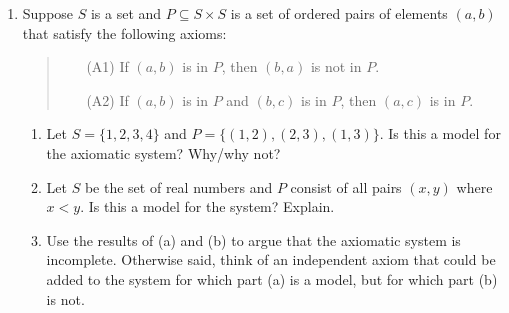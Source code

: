 \begin{exercises}{}{}
\begin{enumerate}
	
	
		\item Suppose $S$ is a set and $P\subseteq S\times S$ is a set of ordered pairs of elements $(a,b)$ that satisfy the following axioms:
	  \begin{quote}
	  \begin{itemize}
	  	\item[(A1)] If $(a,b)$ is in $P$, then $(b,a)$ is not in $P$.
	  	\item[(A2)] If $(a,b)$ is in $P$ and $(b,c)$ is in $P$, then $(a,c)$ is in $P$.
	  \end{itemize}
	  \end{quote}
	  \begin{enumerate}
	    \item Let $S=\{1,2,3,4\}$ and $P=\{(1,2),(2,3),(1,3)\}$. Is this a model for the axiomatic system? Why/why not?
			\item Let $S$ be the set of real numbers and $P$ consist of all pairs $(x,y)$ where $x<y$. Is this a model for the system? Explain.
			\item Use the results of (a) and (b) to argue that the axiomatic system is incomplete. Otherwise said, think of an independent axiom that could be added to the system for which part (a) is a model, but for which part (b) is not.
		\end{enumerate}
		

\end{enumerate}
\end{exercises}
